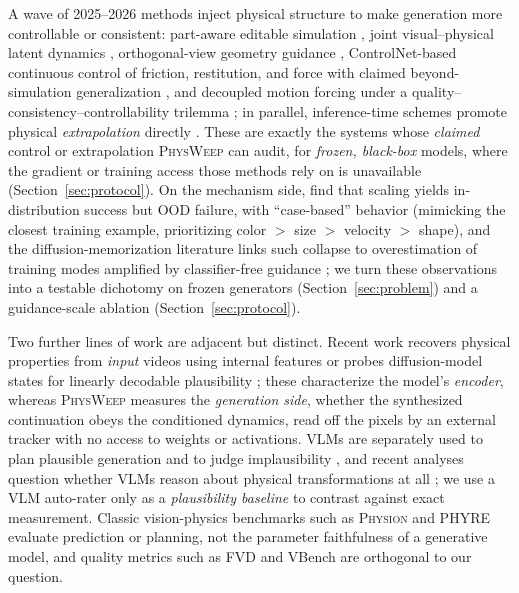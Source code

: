 \documentclass[10pt,twocolumn,letterpaper]{article}
\begin{document}
A wave of 2025--2026 methods inject physical structure to make generation more
controllable or consistent: part-aware editable simulation
\citep{physchoreo2025}, joint visual--physical latent dynamics
\citep{phantom2026}, orthogonal-view geometry guidance \citep{physvideo2026},
ControlNet-based continuous control of friction, restitution, and force with
claimed beyond-simulation generalization \citep{phyco2026}, and decoupled motion
forcing under a quality--consistency--controllability trilemma
\citep{motionforcing2026}; in parallel, inference-time schemes promote physical
\emph{extrapolation} directly \citep{lapg2026}. These are exactly the systems
whose \emph{claimed} control or extrapolation \textsc{PhysWeep} can audit, for
\emph{frozen, black-box} models, where the gradient or training access those
methods rely on is unavailable (Section~\ref{sec:protocol}). On the mechanism
side, \citet{kang2025howfar} find that scaling yields in-distribution success
but OOD failure, with ``case-based'' behavior (mimicking the closest training
example, prioritizing color $>$ size $>$ velocity $>$ shape), and the
diffusion-memorization literature links such collapse to overestimation of
training modes amplified by classifier-free guidance \citep{diffmemorize2025};
we turn these observations into a testable dichotomy on frozen generators
(Section~\ref{sec:problem}) and a guidance-scale ablation
(Section~\ref{sec:protocol}).

Two further lines of work are adjacent but distinct. Recent work recovers
physical properties from \emph{input} videos using internal features
\citep{inferring2025dynamic} or probes diffusion-model states for linearly
decodable plausibility \citep{invisiblehand2026}; these characterize the
model's \emph{encoder}, whereas \textsc{PhysWeep} measures the
\emph{generation side}, whether the synthesized continuation obeys the
conditioned dynamics, read off the pixels by an external tracker with no
access to weights or activations. VLMs are separately used to plan plausible
generation \citep{vlipp2025} and to judge implausibility \citep{travl2025},
and recent analyses question whether VLMs reason about physical
transformations at all \citep{vlmcannotreason2026}; we use a VLM auto-rater
only as a \emph{plausibility baseline} to contrast against exact measurement.
Classic vision-physics benchmarks such as \textsc{Physion} and \textsc{PHYRE}
\citep{bear2021physion,bakhtin2019phyre} evaluate prediction or planning, not
the parameter faithfulness of a generative model, and quality metrics such as
FVD and VBench \citep{unterthiner2018fvd,huang2024vbench} are orthogonal to
our question.
\end{document}

